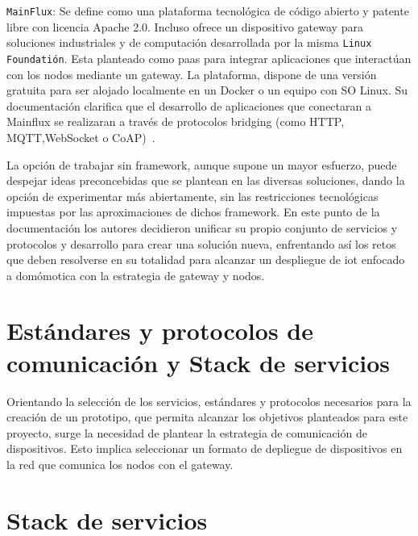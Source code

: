 \vspace{1cm}

\verb|MainFlux|: Se define como una plataforma tecnológica de código abierto y patente libre con licencia Apache 2.0. Incluso ofrece un dispositivo \gls{gateway} para soluciones industriales y de computación desarrollada por la misma \verb|Linux Foundatión|. Esta planteado como \gls{paas} para integrar aplicaciones que interactúan con los nodos mediante un \gls{gateway}. La plataforma, dispone de una versión gratuita para ser alojado localmente en un Docker o un equipo con SO Linux. Su documentación clarifica que el desarrollo de aplicaciones que conectaran a Mainflux se realizaran a través de protocolos bridging (como HTTP, MQTT,WebSocket o CoAP)~\cite{mainfluxdoc}.


La opción de trabajar sin \gls{framework}, aunque supone un mayor esfuerzo, puede despejar ideas preconcebidas que se plantean en las diversas soluciones, dando la opción de experimentar más abiertamente, sin las restricciones tecnológicas impuestas por las aproximaciones de dichos \gls{framework}. En este punto de la documentación los autores decidieron unificar su propio conjunto de servicios y protocolos y desarrollo para crear una solución nueva, enfrentando así los retos que deben resolverse en su totalidad para alcanzar un despliegue de \gls{iot} enfocado a domómotica con la estrategia de \gls{gateway} y nodos.

\section{Estándares y protocolos de comunicación y Stack de servicios}
\label{ch:Capitulo2.3}

Orientando la selección de los servicios, estándares y protocolos necesarios para la creación de un prototipo, que permita alcanzar los objetivos planteados para este proyecto, surge la necesidad de plantear la estrategia de comunicación de dispositivos. Esto implica seleccionar un formato de depliegue de dispositivos en la red que comunica los nodos con el \gls{gateway}. 

\vspace{1cm}

\section{Stack de servicios}
\label{ch:Capitulo2.3.2}

